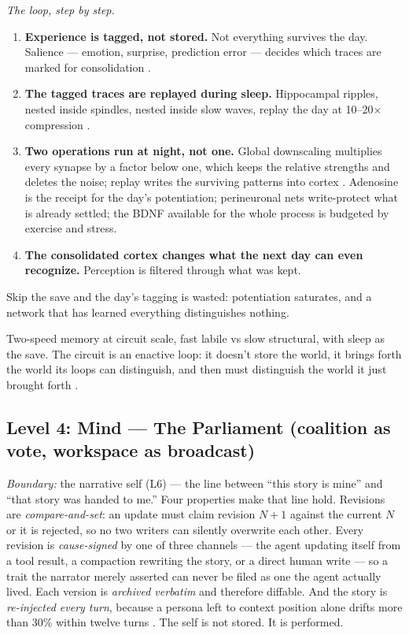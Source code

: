 \documentclass[11pt]{article}
\begin{document}
{\textit{The loop, step by step.}
\begin{enumerate}\itemsep2pt
\item \textbf{Experience is tagged, not stored.} Not everything survives
the day. Salience --- emotion, surprise, prediction error --- decides which
traces are marked for consolidation \citep{seth2021}.
\item \textbf{The tagged traces are replayed during sleep.} Hippocampal
ripples, nested inside spindles, nested inside slow waves, replay the day
at 10--20$\times$ compression \citep{tononi2014}.
\item \textbf{Two operations run at night, not one.} Global downscaling
multiplies every synapse by a factor below one, which keeps the relative
strengths and deletes the noise; replay writes the surviving patterns into
cortex \citep{tononi2014}. Adenosine is the receipt for the day's
potentiation; perineuronal nets write-protect what is already settled; the
BDNF available for the whole process is budgeted by exercise and stress.
\item \textbf{The consolidated cortex changes what the next day can even
recognize.} Perception is filtered through what was kept.
\end{enumerate}

Skip the save and the day's tagging is wasted: potentiation saturates, and
a network that has learned everything distinguishes nothing.

Two-speed memory at circuit scale, fast labile vs slow structural, with sleep as the save. The circuit is an enactive loop: it doesn't store the world, it brings forth the world its loops can distinguish, and then must distinguish the world it just brought forth \citep{maturana1980}.

\subsection{Level 4: Mind --- The Parliament (coalition as vote, workspace as broadcast)}

\textit{Boundary:} the narrative self (L6) --- the line between ``this
story is mine'' and ``that story was handed to me.'' Four properties make
that line hold. Revisions are \emph{compare-and-set}: an update must claim
revision $N{+}1$ against the current $N$ or it is rejected, so no two
writers can silently overwrite each other. Every revision is
\emph{cause-signed} by one of three channels --- the agent updating itself
from a tool result, a compaction rewriting the story, or a direct human
write --- so a trait the narrator merely asserted can never be filed as
one the agent actually lived. Each version is \emph{archived verbatim} and
therefore diffable. And the story is \emph{re-injected every turn},
because a persona left to context position alone drifts more than 30\%
within twelve turns \citep{choi2024}. The self is not stored. It is
performed.

}
\end{document}
